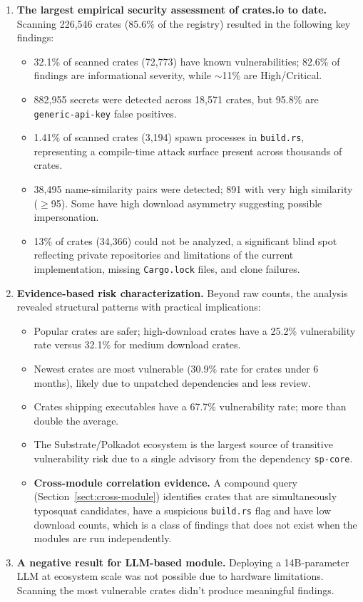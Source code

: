 \begin{enumerate}[leftmargin=*,itemsep=2pt]
\item \textbf{The largest empirical security assessment of crates.io to date.} Scanning 226,546 crates (85.6\% of the registry) resulted in the following key findings:
\begin{itemize}[leftmargin=*,itemsep=1pt]
\item 32.1\% of scanned crates (72,773) have known vulnerabilities; 82.6\% of findings are informational severity, while $\sim$11\% are High/Critical.
\item 882,955 secrets were detected across 18,571 crates, but 95.8\% are \texttt{generic-api-key} false positives.
\item 1.41\% of scanned crates (3,194) spawn processes in \texttt{build.rs}, representing a compile-time attack surface present across thousands of crates.
\item 38,495 name-similarity pairs were detected; 891 with very high similarity ($\ge$95). Some have high download asymmetry suggesting possible impersonation.
\item 13\% of crates (34,366) could not be analyzed, a significant blind spot reflecting private repositories and limitations of the current implementation, missing \texttt{Cargo.lock} files, and clone failures.
\end{itemize}

\item \textbf{Evidence-based risk characterization.} Beyond raw counts, the analysis revealed structural patterns with practical implications:
\begin{itemize}[leftmargin=*,itemsep=1pt]
\item Popular crates are safer; high-download crates have a 25.2\% vulnerability rate versus 32.1\% for medium download crates.
\item Newest crates are most vulnerable (30.9\% rate for crates under 6 months), likely due to unpatched dependencies and less review.
\item Crates shipping executables have a 67.7\% vulnerability rate; more than double the average.
\item The Substrate/Polkadot ecosystem is the largest source of transitive vulnerability risk due to a single advisory from the dependency \texttt{sp-core}.
\item \textbf{Cross-module correlation evidence.} A compound query (Section~\ref{sect:cross-module}) identifies crates that are simultaneously typosquat candidates, have a suspicious \texttt{build.rs} flag and have low download counts, which is a class of findings that does not exist when the modules are run independently.
\end{itemize}

\item \textbf{A negative result for LLM-based module.} Deploying a 14B-parameter LLM at ecosystem scale was not possible due to hardware limitations. Scanning the most vulnerable crates didn't produce meaningful findings.

\end{enumerate}

